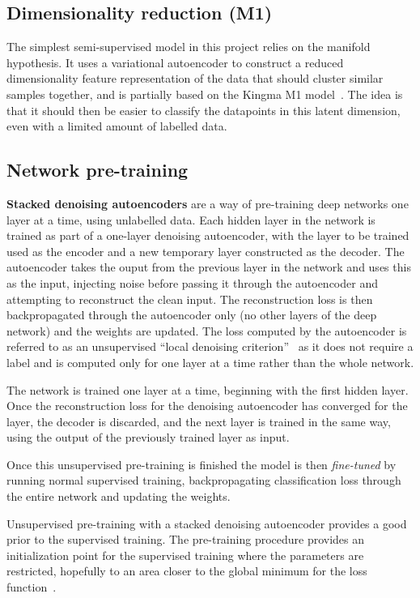 \subsection{Dimensionality reduction (M1)} \label{m1}

The simplest semi-supervised model in this project relies on the manifold hypothesis. It uses a variational autoencoder to construct a
reduced dimensionality feature representation of the data that should cluster similar samples together, and is partially based 
on the Kingma M1 model~\cite{DBLP:journals/corr/KingmaRMW14}. The idea is that it should then be 
easier to classify the datapoints in this latent dimension, even with a limited amount of labelled data.

\subsection{Network pre-training} \label{sdae}

\textbf{Stacked denoising autoencoders} are a way of pre-training deep networks one layer at a time, using unlabelled data. 
Each hidden layer in the network is 
trained as part of a one-layer denoising autoencoder, with the layer to be trained used as the encoder and a new temporary layer constructed
as the decoder. The autoencoder takes the ouput from the previous layer in the network and uses this as the input, injecting noise before 
passing it through the autoencoder and attempting to reconstruct the clean input. The reconstruction loss is then backpropagated through 
the autoencoder only (no other layers of the deep network) and the weights are updated. The loss computed by the autoencoder is referred to 
as an unsupervised ``local denoising criterion''~\cite{Vincent:2010:SDA:1756006.1953039} as it does not require a label and is computed only 
for one layer at a time rather than the whole network.

The network is trained one layer at a time, beginning with the first hidden layer. Once the reconstruction loss for the denoising autoencoder has 
converged for the layer, the decoder is discarded, and the next layer is trained in the same way, using the output of the previously trained
layer as input.

Once this unsupervised pre-training is finished the model is then \textit{fine-tuned} by running normal supervised training, backpropagating
classification loss through the entire network and updating the weights.

Unsupervised pre-training with a stacked denoising autoencoder provides a good prior to the supervised training.
The pre-training procedure provides an initialization point for the supervised training where the parameters are restricted, hopefully to an area 
closer to the global minimum for the loss function~\cite{Erhan:2010:WUP:1756006.1756025}.

